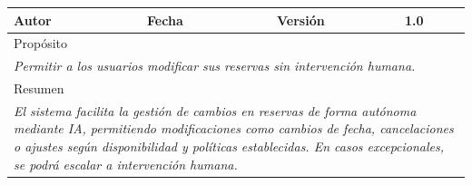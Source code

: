 \begin{table}[H]
\begin{tabular}{|llllllll|}
    \multicolumn{1}{|l|}{Autor}                         & \multicolumn{1}{l|}{}                                    & \multicolumn{2}{l|}{Fecha}                                   & \multicolumn{1}{l|}{}                    & \multicolumn{2}{l|}{Versión}                                 & 1.0                                       \\ \hline
    \multicolumn{8}{|l|}{\cellcolor[HTML]{F2F2F2}Propósito}                                                                                                                                                                                                                                                                             \\ \hline
    \multicolumn{8}{|p{15cm}|}{{\color[HTML]{808080} \textit{Permitir a los usuarios modificar sus reservas sin intervención humana.}}}                                                                                                                                                                                                       \\ \hline
    \multicolumn{8}{|l|}{\cellcolor[HTML]{F2F2F2}Resumen}                                                                                                                                                                                                                                                                               \\ \hline
    \multicolumn{8}{|p{15cm}|}{{\color[HTML]{999999} \textit{El sistema facilita la gestión de cambios en reservas de forma autónoma mediante IA, permitiendo modificaciones como cambios de fecha, cancelaciones o ajustes según disponibilidad y políticas establecidas. En casos excepcionales, se podrá escalar a intervención humana.}}} \\ \hline
    \end{tabular}
    \end{table}

